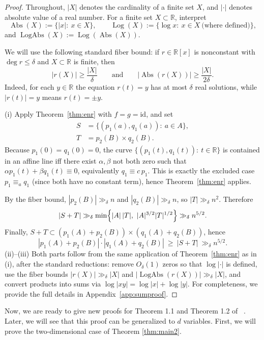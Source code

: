 \documentclass[12pt,reqno]{amsart}
\numberwithin{equation}{section}
\newcommand{\abs}[1]{\lvert#1\rvert}
\DeclareMathOperator{\Absset}{Abs}
\DeclareMathOperator{\Logset}{Log}
\DeclareMathOperator{\LogAbsset}{LogAbs}
\begin{document}
\begin{proof}
Throughout, $|X|$ denotes the cardinality of a finite set $X$,
and $\abs{\cdot}$ denotes absolute value of a real number.
For a finite set $X\subset\mathbb{R}$, interpret
\[
\Absset(X):=\{\abs{x}:\ x\in X\},\qquad
\Logset(X):=\{\log x:\ x\in X\ \text{(where defined)}\},
\]
and $\LogAbsset(X):=\Logset(\Absset(X))$.

\medskip
We will use the following standard fiber bound:
if $r\in\mathbb R[x]$ is nonconstant with $\deg r\le \delta$ and $X\subset\mathbb R$ is finite, then
\[
|r(X)|\ge \frac{|X|}{\delta}
\qquad\text{and}\qquad
|\Absset(r(X))|\ge \frac{|X|}{2\delta}.
\]
Indeed, for each $y\in\mathbb R$ the equation $r(t)=y$ has at most $\delta$ real solutions,
while $\abs{r(t)}=y$ means $r(t)=\pm y$.

\medskip
\noindent (i)
Apply Theorem~\ref{thm:enr} with $f=g=\mathrm{id}$, and set
\[
\begin{aligned}
S&=\{(p_1(a),q_1(a)):\ a\in A\},\\
T&=p_2(B)\times q_2(B).
\end{aligned}
\]
Because $p_1(0)=q_1(0)=0$, the curve $\{(p_1(t),q_1(t)):\ t\in\mathbb R\}$
is contained in an affine line iff there exist $\alpha,\beta$ not both zero such that
$\alpha p_1(t)+\beta q_1(t)\equiv 0$, equivalently $q_1\equiv c\,p_1$.
This is exactly the excluded case $p_1\equiv_a q_1$ (since both have no constant term),
hence Theorem~\ref{thm:enr} applies.

By the fiber bound, $|p_2(B)|\gg_\delta n$ and $|q_2(B)|\gg_\delta n$, so $|T|\gg_\delta n^2$.
Therefore
\[
|S+T|\gg_\delta
\min\Bigl\{|A|\,|T|,\ |A|^{3/2}|T|^{1/2}\Bigr\}
\gg_\delta n^{5/2}.
\]
Finally, $S+T\subset (p_1(A)+p_2(B))\times (q_1(A)+q_2(B))$, hence
\[
|p_1(A)+p_2(B)|\cdot |q_1(A)+q_2(B)|
\ \ge\ |S+T|\ \gg_\delta n^{5/2}.
\]
\medskip
\noindent (ii)--(iii)
Both parts follow from the same application of Theorem~\ref{thm:enr} as in (i),
after the standard reductions: remove $O_\delta(1)$ zeros so that $\log|\cdot|$ is defined,
use the fiber bounds $|r(X)|\gg_\delta |X|$ and $|\LogAbsset(r(X))|\gg_\delta |X|$,
and convert products into sums via $\log|xy|=\log|x|+\log|y|$.
For completeness, we provide the full details in Appendix~\ref{app:sumproof}.
\end{proof}


Now, we are ready to give new proofs for Theorem 1.1 and Theorem 1.2 of ~\cite{jing2022semialgebraic}. Later, we will see that this proof can be generalized to $d$ variables.  First, we will prove the two-dimensional case of Theorem \ref{thm:main2}.
\end{document}
